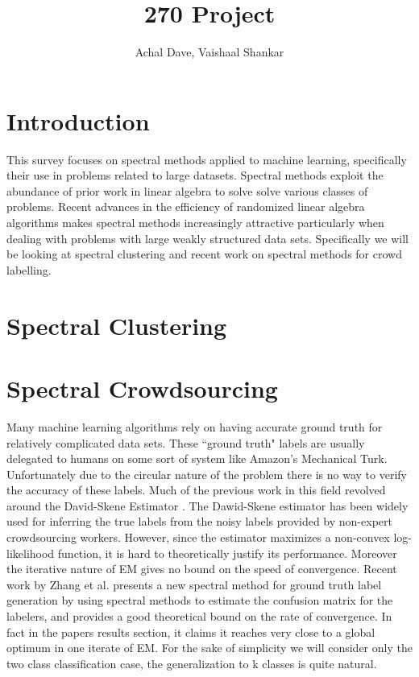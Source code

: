 \documentclass{article}
\title{270 Project}
\author{Achal Dave, Vaishaal Shankar}
\date{}
\begin{document}
\maketitle
\tableofcontents
\clearpage


\section{Introduction}
This survey focuses on spectral methods applied to machine learning, specifically their use in problems related to large datasets. Spectral methods exploit the abundance of prior work in linear algebra to solve solve various classes of problems. Recent advances in the efficiency of randomized linear algebra algorithms makes spectral methods increasingly attractive particularly when dealing with problems with large weakly structured data sets. Specifically we will be looking at spectral clustering and recent work on spectral methods for crowd labelling.

\section{Spectral Clustering}


\newpage

\section{Spectral Crowdsourcing}
    Many machine learning algorithms rely on having accurate ground truth for relatively complicated data sets. These ``ground truth" labels are usually delegated to humans on some sort of system like Amazon's Mechanical Turk. Unfortunately due to the circular nature of the problem there is no way to verify the accuracy of these labels. Much of the previous work in this field revolved around the David-Skene Estimator \cite{dawid1979maximum}. The Dawid-Skene estimator has been widely used for inferring the true labels from the noisy labels provided by non-expert crowdsourcing workers. However, since the estimator maximizes a non-convex log-likelihood function, it is hard to theoretically justify its performance. Moreover the iterative nature of EM gives no bound on the speed of convergence.  Recent work by Zhang et al. \cite{zhang2014spectral} presents a new spectral method for ground truth label generation by using spectral methods to estimate the confusion matrix for the labelers, and provides a good theoretical bound on the rate of convergence. In fact in the papers results section, it claims it reaches very close to a global optimum in one iterate of EM. For the sake of simplicity we will consider only the two class classification case, the generalization to k classes is quite natural.
\end{document}
